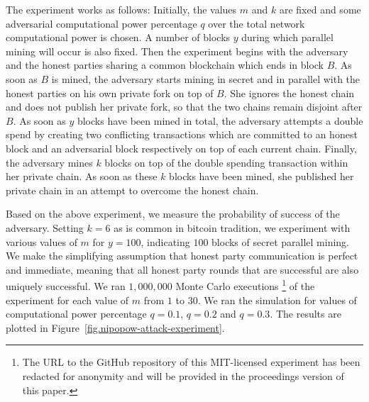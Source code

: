 The experiment works as follows: Initially, the values $m$ and $k$ are fixed
and some adversarial computational power percentage $q$ over the total network
computational power is chosen. A number of blocks $y$ during which parallel
mining will occur is also fixed. Then the experiment begins with the adversary
and the honest parties sharing a common blockchain which ends in block $B$. As
soon as $B$ is mined, the adversary starts mining in secret and in parallel
with the honest parties on his own private fork on top of $B$. She ignores the
honest chain and does not publish her private fork, so that the two chains
remain disjoint after $B$. As soon as $y$ blocks have been mined in total, the
adversary attempts a double spend by creating two conflicting transactions
which are committed to an honest block and an adversarial block respectively on
top of each current chain. Finally, the adversary mines $k$ blocks on top of
the double spending transaction within her private chain. As soon as these $k$
blocks have been mined, she published her private chain in an attempt to
overcome the honest chain.

Based on the above experiment, we measure the probability of success of the
adversary. Setting $k = 6$ as is common in bitcoin tradition, we experiment
with various values of $m$ for $y = 100$, indicating $100$ blocks of secret
parallel mining. We make the simplifying assumption that honest party
communication is perfect and immediate, meaning that all honest party rounds
that are successful are also uniquely successful. We ran $1,000,000$ Monte
Carlo executions \footnote{The URL to the GitHub repository of this
MIT-licensed experiment has been redacted for anonymity and will be provided in
the proceedings version of this paper.} of the experiment for each value of $m$
from $1$ to $30$. We ran the simulation for values of computational power
percentage $q = 0.1$, $q = 0.2$ and $q = 0.3$. The results are plotted in
Figure~\ref{fig.nipopow-attack-experiment}.

